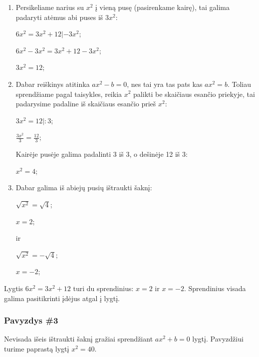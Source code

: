 \documentclass[a4paper]{article}
\newcommand{\germanqq}[1]{{\selectlanguage{german}\glqq#1\grqq\selectlanguage{english}}}
\begin{document}
\begin{enumerate}

      \item Persikeliame narius su $ x^2 $ į vieną pusę (pasirenkame kairę),
            tai
            galima padaryti atėmus abi puses iš $ 3x^{2} $:

            $ 6x^{2}=3x^{2}+12|-3x^{2} $;

            $ 6x^{2}-3x^{2}=3x^{2}+12-3x^{2} $;

            $ 3x^{2}=12 $;

      \item Dabar reiškinys atitinka $ ax^{2}-b=0 $, nes tai yra tas pats kas $
                  ax^{2}=b $. Toliau sprendžiame pagal taisykles, reikia $ x^2
            $
            palikti be
            skaičiaus esančio priekyje, tai padarysime padaline iš skaičiaus
            esančio prieš
            $ x^{2} $:

            $ 3x^{2}=12 |: 3 $;

            $ \frac{3x^{2}}{3}=\frac{12}{3}$;

            Kairėje pusėje galima padalinti 3 iš 3, o dešinėje 12 iš 3:

            $ x^{2}=4 $;

      \item Dabar galima iš abiejų pusių ištraukti šaknį:

            $ \sqrt{x^{2}}=\sqrt{4}$;

            $ x=2$;

            ir

            $ \sqrt{x^{2}}=-\sqrt{4}$;

            $ x=-2$;

\end{enumerate}

Lygtis $ 6x^{2}=3x^{2}+12 $ turi du sprendinius: $ x=2 $ ir $x=-2$. Sprendinius
visada galima pasitikrinti įdėjus atgal į lygtį.

\subsubsection{Pavyzdys \#3}

Nevisada išeis ištraukti šaknį \germanqq{gražiai} sprendžiant $ ax^{2}+b=0 $
lygtį. Pavyzdžiui turime paprastą lygtį $ x^{2}=40 $.
\end{document}
